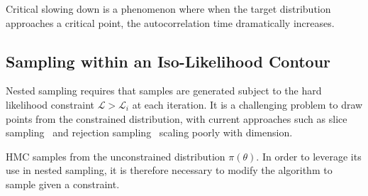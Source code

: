 \documentclass[11pt]{article}
\begin{document}
    Critical slowing down is a phenomenon where when the target distribution approaches a critical point,
    the autocorrelation time dramatically increases.

\subsection{Sampling within an Iso-Likelihood Contour}\label{subsec:isolikelood_sampling}
    Nested sampling requires that samples are generated subject to the hard likelihood constraint
    $\mathcal{L} > \mathcal{L}_i$ at each iteration.
    It is a challenging problem to draw points from the constrained distribution, with current approaches such as
    slice sampling~\cite{neal2003slice} and rejection sampling~\cite{Feroz_2009} scaling poorly with dimension.

    HMC samples from the unconstrained distribution $\pi(\theta)$.
    In order to leverage its use in nested sampling, it is therefore necessary to modify the algorithm to sample
    given a constraint.
\end{document}
